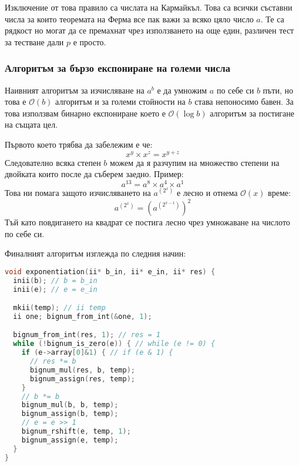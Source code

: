 Изключение от това правило са числата на Кармайкъл. Това са всички съставни числа за които теоремата на Ферма все пак важи за всяко цяло число $a$. Те са рядкост но могат да се премахнат чрез използването на още един, различен тест за тестване дали $p$ е просто.

\subsubsection{Алгоритъм за бързо експониране на големи числа}
Наивният алгоритъм за изчисляване на $a^b$ е да умножим $a$ по себе си $b$ пъти, но това е $\mathcal{O}(b)$ алгоритъм и за големи стойности на $b$ става непоносимо бавен. За това използвам бинарно експониране което е $\mathcal{O}(\log b)$ алгоритъм за постигане на същата цел.

Първото което трябва да забележим е че:
$$ x^y \times x^z = x^{y+z} $$
Следователно всяка степен $b$ можем да я разчупим на множество степени на двойката които после да съберем заедно. Пример:
$$ a^{13} = a^8 \times a^4 \times a^1 $$
Това ни помага защото изчисляването на $a^{(2^x)}$ е лесно и отнема $\mathcal{O}(x)$ време:
$$ a^{(2^x)} = (a^{(2^{x-1})})^2$$
Тъй като повдигането на квадрат се постига лесно чрез умножаване на числото по себе си.

Финалният алгоритъм изглежда по следния начин:
\begin{lstlisting}[language=C]
void exponentiation(ii* b_in, ii* e_in, ii* res) {
  inii(b); // b = b_in
  inii(e); // e = e_in

  mkii(temp); // ii temp
  ii one; bignum_from_int(&one, 1);

  bignum_from_int(res, 1); // res = 1
  while (!bignum_is_zero(e)) { // while (e != 0) {
    if (e->array[0]&1) { // if (e & 1) {
      // res *= b
      bignum_mul(res, b, temp);
      bignum_assign(res, temp);
    }
    // b *= b
    bignum_mul(b, b, temp);
    bignum_assign(b, temp);
    // e = e >> 1
    bignum_rshift(e, temp, 1);
    bignum_assign(e, temp);
  }
}
\end{lstlisting}


